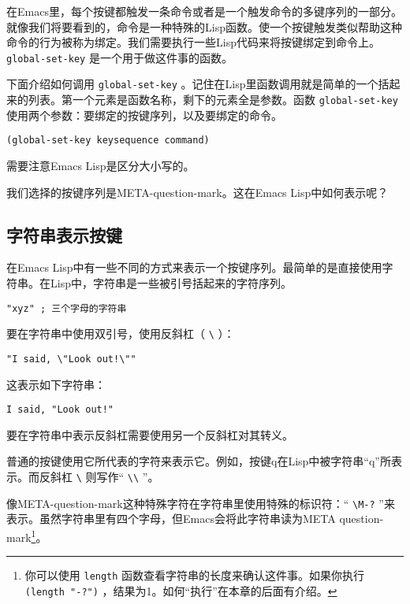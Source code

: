 在Emacs里，每个按键都触发一条命令或者是一个触发命令的多键序列的一部分。就像我们将要看到的，命令是一种特殊的Lisp函数。使一个按键触发类似帮助这种命令的行为被称为绑定。我们需要执行一些Lisp代码来将按键绑定到命令上。 \texttt{global-set-key} 是一个用于做这件事的函数。

下面介绍如何调用 \texttt{global-set-key} 。记住在Lisp里函数调用就是简单的一个括起来的列表。第一个元素是函数名称，剩下的元素全是参数。函数 \texttt{global-set-key} 使用两个参数：要绑定的按键序列，以及要绑定的命令。

\begin{verbatim}
(global-set-key keysequence command)
\end{verbatim}

需要注意Emacs Lisp是区分大小写的。

我们选择的按键序列是META-question-mark。这在Emacs Lisp中如何表示呢？

\subsection{字符串表示按键}
\label{section:01-Denoting-Keys-in-Strings}

在Emacs Lisp中有一些不同的方式来表示一个按键序列。最简单的是直接使用字符串。在Lisp中，字符串是一些被引号括起来的字符序列。

\begin{verbatim}
"xyz" ; 三个字母的字符串
\end{verbatim}

要在字符串中使用双引号，使用反斜杠（ \verb|\| ）：

\begin{verbatim}
"I said, \"Look out!\""
\end{verbatim}

这表示如下字符串：
\begin{verbatim}
I said, "Look out!"
\end{verbatim}

要在字符串中表示反斜杠需要使用另一个反斜杠对其转义。

普通的按键使用它所代表的字符来表示它。例如，按键q在Lisp中被字符串“q”所表示。而反斜杠 \verb|\| 则写作“ \verb|\\| ”。

像META-question-mark这种特殊字符在字符串里使用特殊的标识符：“ \verb|\M-?| ”来表示。虽然字符串里有四个字母，但Emacs会将此字符串读为META question-mark\footnote{你可以使用 \texttt{length} 函数查看字符串的长度来确认这件事。如果你执行 \texttt{(length "\M-?")} ，结果为1。如何“执行”在本章的后面有介绍。}。

